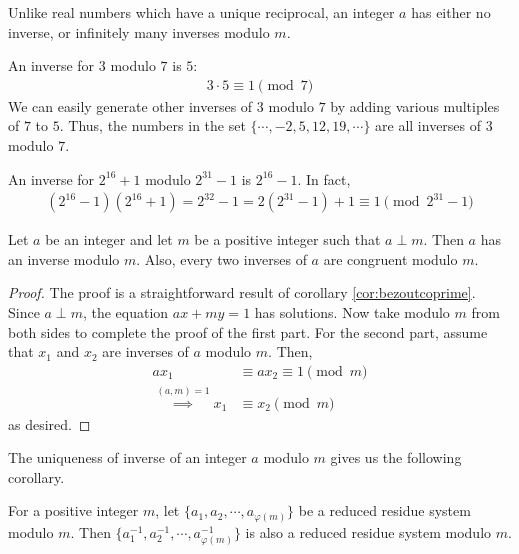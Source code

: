 \documentclass{subfile}
\begin{document}
	\begin{note}
		Unlike real numbers which have a unique reciprocal, an integer $a$ has either no inverse, or infinitely many inverses modulo $m$.
	\end{note}

	\begin{example}
		An inverse for $3$ modulo $7$ is $5$:
			\begin{align*}
				3 \cdot 5 \equiv 1 \pmod 7
			\end{align*}
		We can easily generate other inverses of $3$ modulo $7$ by adding various multiples of $7$ to $5$. Thus, the numbers in the set $\{\cdots, -2, 5, 12, 19, \cdots \}$ are all inverses of $3$ modulo $7$.
	\end{example}

	\begin{example}
		An inverse for $2^{16}+1$ modulo $2^{31}-1$ is $2^{16}-1$. In fact,
			\begin{align*}
				(2^{16} - 1)(2^{16} + 1) = 2^{32} -1 = 2(2^{31} - 1) + 1 \equiv 1 \pmod{2^{31} - 1}
			\end{align*}
	\end{example}


	\begin{theorem} \label{thm:arithinverse}
		Let $a$ be an integer and let $m$ be a positive integer such that $a \perp m$. Then $a$ has an inverse modulo $m$. Also, every two inverses of $a$ are congruent modulo $m$.
	\end{theorem}

	\begin{proof}
		The proof is a straightforward result of corollary \eqref{cor:bezoutcoprime}. Since $a \perp m$, the equation $ax+my=1$ has solutions. Now take modulo $m$ from both sides to complete the proof of the first part. For the second part, assume that $x_1$ and $x_2$ are inverses of $a$ modulo $m$. Then,
		\begin{align*}
		ax_1
			& \equiv ax_2 \equiv 1 \pmod m\\
		\stackrel{(a,m)=1}{\implies} x_1
			& \equiv x_2 \pmod m
		\end{align*}
		as desired.
	\end{proof}

The uniqueness of inverse of an integer $a$ modulo $m$ gives us the following corollary.

	\begin{corollary}
		For a positive integer $m$, let $\{a_{1}, a_{2}, \cdots, a_{\varphi(m)}\}$ be a reduced residue system modulo $m$. Then $\{a_{1}^{-1}, a_{2}^{-1}, \cdots, a_{\varphi(m)}^{-1}\}$ is also a reduced residue system modulo $m$.
	\end{corollary}
\end{document}
